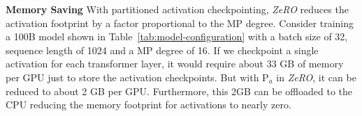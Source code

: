 \documentclass{article}
\newcommand{\name}{\emph{ZeRO}\xspace}
\begin{document}

\textbf{Memory Saving} With partitioned activation checkpointing, \name reduces the activation footprint by a factor proportional to the MP degree. Consider training a 100B model shown in Table~\ref{tab:model-configuration} with a batch size of 32, sequence length of 1024 and a MP degree of 16. If we checkpoint a single activation for each transformer layer, it would require about 33 GB of memory per GPU just to store the activation checkpoints. But with P$_a$ in \name, it can be reduced to about 2 GB per GPU. Furthermore, this 2GB can be offloaded  to the CPU reducing the memory footprint for activations to nearly zero.
\end{document}
